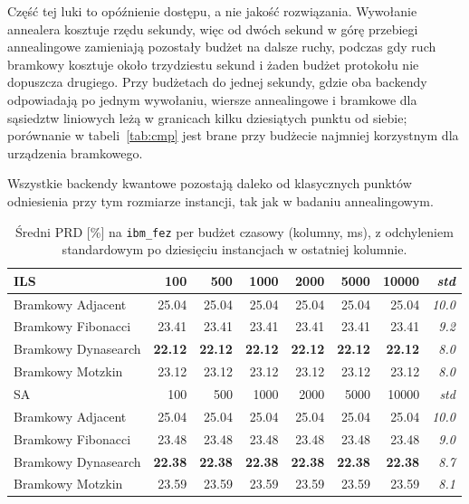 \documentclass[11pt,a4paper]{article}
\begin{document}
Część tej luki to opóźnienie dostępu, a nie jakość rozwiązania. Wywołanie
annealera kosztuje rzędu sekundy, więc od dwóch sekund w górę przebiegi
annealingowe zamieniają pozostały budżet na dalsze ruchy, podczas gdy ruch
bramkowy kosztuje około trzydziestu sekund i żaden budżet protokołu nie
dopuszcza drugiego. Przy budżetach do jednej sekundy, gdzie oba backendy
odpowiadają po jednym wywołaniu, wiersze annealingowe i bramkowe dla
sąsiedztw liniowych leżą w granicach kilku dziesiątych punktu od siebie;
porównanie w tabeli~\ref{tab:cmp} jest brane przy budżecie najmniej korzystnym
dla urządzenia bramkowego.

Wszystkie backendy kwantowe pozostają daleko od klasycznych punktów odniesienia
przy tym rozmiarze instancji, tak jak w badaniu annealingowym.

\begin{table}[t]
\centering
\caption{Średni PRD [\%] na \texttt{ibm\_fez} per budżet czasowy (kolumny, ms),
  z odchyleniem standardowym po dziesięciu instancjach w ostatniej kolumnie.}
\label{tab:rpd_hw}
\footnotesize
\renewcommand{\arraystretch}{0.95}
\begin{tabular*}{\textwidth}{@{\extracolsep{\fill}}lrrrrrr@{\hspace{1.2em}}r@{}}
\toprule
ILS & 100 & 500 & 1000 & 2000 & 5000 & 10000 & \emph{std} \\
\midrule
Bramkowy Adjacent   & 25.04 & 25.04 & 25.04 & 25.04 & 25.04 & 25.04 & \emph{10.0} \\
Bramkowy Fibonacci  & 23.41 & 23.41 & 23.41 & 23.41 & 23.41 & 23.41 & \emph{9.2} \\
Bramkowy Dynasearch & \textbf{22.12} & \textbf{22.12} & \textbf{22.12} & \textbf{22.12} & \textbf{22.12} & \textbf{22.12} & \emph{8.0} \\
Bramkowy Motzkin    & 23.12 & 23.12 & 23.12 & 23.12 & 23.12 & 23.12 & \emph{8.0} \\
\midrule
SA & 100 & 500 & 1000 & 2000 & 5000 & 10000 & \emph{std} \\
\midrule
Bramkowy Adjacent   & 25.04 & 25.04 & 25.04 & 25.04 & 25.04 & 25.04 & \emph{10.0} \\
Bramkowy Fibonacci  & 23.48 & 23.48 & 23.48 & 23.48 & 23.48 & 23.48 & \emph{9.0} \\
Bramkowy Dynasearch & \textbf{22.38} & \textbf{22.38} & \textbf{22.38} & \textbf{22.38} & \textbf{22.38} & \textbf{22.38} & \emph{8.7} \\
Bramkowy Motzkin    & 23.59 & 23.59 & 23.59 & 23.59 & 23.59 & 23.59 & \emph{8.1} \\
\bottomrule
\end{tabular*}
\end{table}
\end{document}
